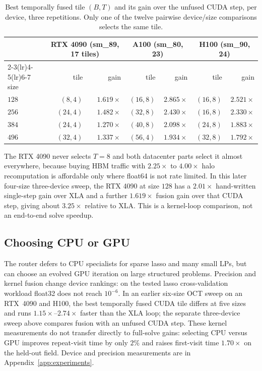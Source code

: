 \begin{table}[htbp]\centering\footnotesize
\caption{Best temporally fused tile $(B,T)$ and its gain over the unfused
CUDA step, per device, three repetitions. Only one of the twelve pairwise
device/size comparisons selects the same tile.}
\label{tab:tiles3}
\begin{tabular}{@{}lrrrrrr@{}}
\toprule
 & \multicolumn{2}{c}{RTX 4090 (sm\_89, 17 tiles)} &
   \multicolumn{2}{c}{A100 (sm\_80, 23)} &
   \multicolumn{2}{c}{H100 (sm\_90, 24)} \\
\cmidrule(lr){2-3}\cmidrule(lr){4-5}\cmidrule(lr){6-7}
size & tile & gain & tile & gain & tile & gain \\
\midrule
$128$ & $(8,4)$  & $1.619\times$ & $(16,8)$ & $2.865\times$ & $(16,8)$ & $2.521\times$ \\
$256$ & $(24,4)$ & $1.482\times$ & $(32,8)$ & $2.430\times$ & $(16,8)$ & $2.330\times$ \\
$384$ & $(24,4)$ & $1.270\times$ & $(40,8)$ & $2.098\times$ & $(24,8)$ & $1.883\times$ \\
$496$ & $(32,4)$ & $1.337\times$ & $(56,4)$ & $1.934\times$ & $(32,8)$ & $1.792\times$ \\
\bottomrule
\end{tabular}
\end{table}

The RTX 4090 never selects $T=8$ and both datacenter parts select it almost
everywhere, because buying HBM traffic with $2.25\times$ to $4.00\times$ halo
recomputation is affordable only where float64 is not rate limited. In this
later four-size three-device sweep, the RTX 4090 at size $128$ has a
$2.01\times$ hand-written single-step gain over XLA and a further
$1.619\times$ fusion gain over that CUDA step, giving about $3.25\times$
relative to XLA. This is a kernel-loop comparison, not an end-to-end solve
speedup.

\subsection{Choosing CPU or GPU}
\label{sec:exp:device}
The router defers to CPU specialists for sparse lasso and many small LPs, but can choose an evolved GPU iteration on large structured problems. Precision and kernel fusion change device rankings: on the tested lasso cross-validation workload float32 does not reach $10^{-6}$. In an earlier six-size OCT sweep on an RTX~4090 and H100, the best temporally fused CUDA tile differs at five sizes and runs $1.15\times$--$2.74\times$ faster than the XLA loop; the separate three-device sweep above compares fusion with an unfused CUDA step. These kernel measurements do not transfer directly to full-solve gains: selecting CPU versus GPU improves repeat-visit time by only $2\%$ and raises first-visit time $1.70\times$ on the held-out field. Device and precision measurements are in Appendix~\ref{app:experiments}.
